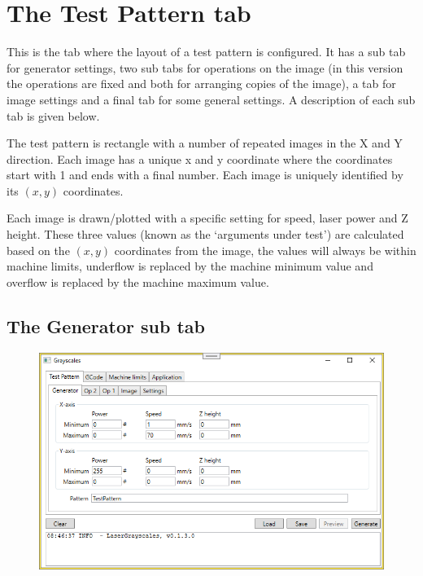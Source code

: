 \section{The Test Pattern tab}\label{TestPatternTab}

This is the tab where the layout of a test pattern is configured. It has a sub tab for generator settings, two sub tabs for operations on the image (in this version
the operations are fixed and both for arranging copies of the image), a tab for image settings and a final tab for some general settings. A description of each
sub tab is given below.

The test pattern is rectangle with a number of repeated images in the X and Y direction. Each image has a unique x and y coordinate where the coordinates start
with 1 and ends with a final number. Each image is uniquely identified by its $(x, y)$ coordinates.

Each image is drawn/plotted with a specific setting for speed, laser power and Z height. These three values (known as the `arguments under test') are calculated
based on the $(x, y)$ coordinates from the image, the values will always be within machine limits, underflow is replaced by the machine minimum value and overflow
is replaced by the machine maximum value.

\subsection{The Generator sub tab}\label{TestPatternGeneratorTab}
\begin{figure}[h!]
    \centering
    \includegraphics[width=0.8\linewidth]{./images/Generator.png}
\end{figure}

